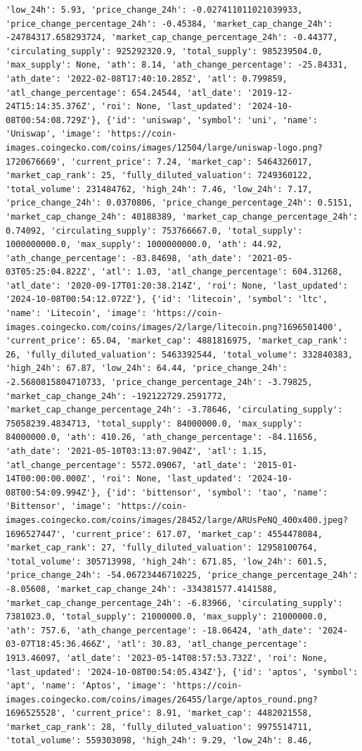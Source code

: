 \documentclass[
  letterpaper,
  DIV=11,
  numbers=noendperiod]{scrreprt}
\begin{document}
\begin{verbatim}
'low_24h': 5.93, 'price_change_24h': -0.027411011021039933, 'price_change_percentage_24h': -0.45384, 'market_cap_change_24h': -24784317.658293724, 'market_cap_change_percentage_24h': -0.44377, 'circulating_supply': 925292320.9, 'total_supply': 985239504.0, 'max_supply': None, 'ath': 8.14, 'ath_change_percentage': -25.84331, 'ath_date': '2022-02-08T17:40:10.285Z', 'atl': 0.799859, 'atl_change_percentage': 654.24544, 'atl_date': '2019-12-24T15:14:35.376Z', 'roi': None, 'last_updated': '2024-10-08T00:54:08.729Z'}, {'id': 'uniswap', 'symbol': 'uni', 'name': 'Uniswap', 'image': 'https://coin-images.coingecko.com/coins/images/12504/large/uniswap-logo.png?1720676669', 'current_price': 7.24, 'market_cap': 5464326017, 'market_cap_rank': 25, 'fully_diluted_valuation': 7249360122, 'total_volume': 231484762, 'high_24h': 7.46, 'low_24h': 7.17, 'price_change_24h': 0.0370806, 'price_change_percentage_24h': 0.5151, 'market_cap_change_24h': 40188389, 'market_cap_change_percentage_24h': 0.74092, 'circulating_supply': 753766667.0, 'total_supply': 1000000000.0, 'max_supply': 1000000000.0, 'ath': 44.92, 'ath_change_percentage': -83.84698, 'ath_date': '2021-05-03T05:25:04.822Z', 'atl': 1.03, 'atl_change_percentage': 604.31268, 'atl_date': '2020-09-17T01:20:38.214Z', 'roi': None, 'last_updated': '2024-10-08T00:54:12.072Z'}, {'id': 'litecoin', 'symbol': 'ltc', 'name': 'Litecoin', 'image': 'https://coin-images.coingecko.com/coins/images/2/large/litecoin.png?1696501400', 'current_price': 65.04, 'market_cap': 4881816975, 'market_cap_rank': 26, 'fully_diluted_valuation': 5463392544, 'total_volume': 332840383, 'high_24h': 67.87, 'low_24h': 64.44, 'price_change_24h': -2.5680815804710733, 'price_change_percentage_24h': -3.79825, 'market_cap_change_24h': -192122729.2591772, 'market_cap_change_percentage_24h': -3.78646, 'circulating_supply': 75058239.4834713, 'total_supply': 84000000.0, 'max_supply': 84000000.0, 'ath': 410.26, 'ath_change_percentage': -84.11656, 'ath_date': '2021-05-10T03:13:07.904Z', 'atl': 1.15, 'atl_change_percentage': 5572.09067, 'atl_date': '2015-01-14T00:00:00.000Z', 'roi': None, 'last_updated': '2024-10-08T00:54:09.994Z'}, {'id': 'bittensor', 'symbol': 'tao', 'name': 'Bittensor', 'image': 'https://coin-images.coingecko.com/coins/images/28452/large/ARUsPeNQ_400x400.jpeg?1696527447', 'current_price': 617.07, 'market_cap': 4554478084, 'market_cap_rank': 27, 'fully_diluted_valuation': 12958100764, 'total_volume': 305713998, 'high_24h': 671.85, 'low_24h': 601.5, 'price_change_24h': -54.06723446710225, 'price_change_percentage_24h': -8.05608, 'market_cap_change_24h': -334381577.4141588, 'market_cap_change_percentage_24h': -6.83966, 'circulating_supply': 7381023.0, 'total_supply': 21000000.0, 'max_supply': 21000000.0, 'ath': 757.6, 'ath_change_percentage': -18.06424, 'ath_date': '2024-03-07T18:45:36.466Z', 'atl': 30.83, 'atl_change_percentage': 1913.46097, 'atl_date': '2023-05-14T08:57:53.732Z', 'roi': None, 'last_updated': '2024-10-08T00:54:05.434Z'}, {'id': 'aptos', 'symbol': 'apt', 'name': 'Aptos', 'image': 'https://coin-images.coingecko.com/coins/images/26455/large/aptos_round.png?1696525528', 'current_price': 8.91, 'market_cap': 4482021558, 'market_cap_rank': 28, 'fully_diluted_valuation': 9975514711, 'total_volume': 559303098, 'high_24h': 9.29, 'low_24h': 8.46, 
\end{verbatim}
\end{document}
